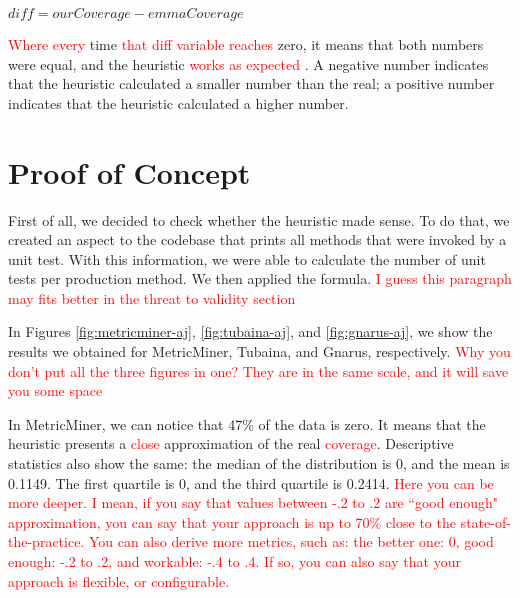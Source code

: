 \documentclass{sig-alternate}
\begin{document}
$ diff = ourCoverage - emmaCoverage$


\textcolor{red}{Where every}  time  \textcolor{red}{that diff variable reaches} zero, it means that both numbers
were equal, and the heuristic \textcolor{red}{works as expected} . A negative number indicates that the heuristic calculated
a smaller number than the real; a positive number indicates that the heuristic calculated a higher
number.



\section{Proof of Concept}
\label{poc}

First of all, we decided to check whether the heuristic made sense. To do that, we 
created an aspect to the codebase that prints all methods that were invoked by a unit test. 
With this information, we were able to calculate the number of unit tests per production method. 
We then applied the formula. \textcolor{red}{I guess this paragraph may fits better in the threat to validity section}

In Figures \ref{fig:metricminer-aj}, \ref{fig:tubaina-aj}, and
\ref{fig:gnarus-aj}, we show the results we obtained for MetricMiner, Tubaina, and Gnarus, respectively. \textcolor{red}{Why you don't put all the three figures in one? They are in the same scale, and it will save you some space}

In MetricMiner, we can notice that 47\% of the data is zero. It means that the heuristic
presents a \textcolor{red}{close}  approximation of the real \textcolor{red}{coverage}. Descriptive statistics also show the same: 
the median of the distribution is 0, and the mean is 0.1149. The first quartile is 0, and the
third quartile is 0.2414. \textcolor{red}{Here you can be more deeper. I mean, if you say that values between -.2 to .2 are ``good enough" approximation, you can say that your approach is up to 70\% close to the state-of-the-practice. You can also derive more metrics, such as: the better one: 0, good enough: -.2 to .2, and workable: -.4 to .4. If so, you can also say that your approach is flexible, or configurable.}
\end{document}
